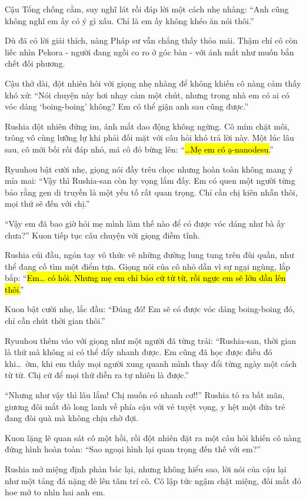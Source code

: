 \documentclass[../main.tex]{subfiles}
\begin{document}
Cậu Tổng chống cằm, suy nghĩ lát rồi đáp lời một cách nhẹ nhàng: ``Anh cũng không nghĩ em ấy có ý gì xấu. Chỉ là em ấy không khéo ăn nói thôi.''

Dù đã có lời giải thích, nàng Pháp sư vẫn chẳng thấy thỏa mái. Thậm chí cô còn liếc nhìn Pekora - người đang ngồi co ro ở góc bàn - với ánh mắt như muốn bắn chết đối phương.

Cậu thở dài, đột nhiên hỏi với giọng nhẹ nhàng để không khiến cô nàng cảm thấy khó xử: ``Nói chuyện này hơi nhạy cảm một chút, nhưng trong nhà em có ai có vóc dáng `boing-boing' không? Em có thể giận anh sau cũng được.''

Rushia đột nhiên đứng im, ánh mắt dao động không ngừng. Cô mím chặt môi, trông vô cùng lưỡng lự khi phải đối mặt với câu hỏi khó trả lời này. Một lúc lâu sau, cô mới bối rối đáp nhỏ, má cô đỏ bừng lên: ``\hl{\dots Mẹ em có ạ-nanodesu.}''

Ryuuhou bật cười nhẹ, giọng nói đầy trêu chọc nhưng hoàn toàn không mang ý mỉa mai: ``Vậy thì Rushia-san còn hy vọng lắm đấy. Em có quen một người từng bảo rằng gen di truyền là một yếu tố rất quan trọng. Chỉ cần chị kiên nhẫn thôi, mọi thứ sẽ đến với chị.''

``Vậy em đã bao giờ hỏi mẹ mình làm thế nào để có được vóc dáng như bà ấy chưa?'' Kuon tiếp tục câu chuyện với giọng điềm tĩnh.

Rushia cúi đầu, ngón tay vô thức vẽ những đường lung tung trên đùi quần, như thể đang cố tìm một điểm tựa. Giọng nói của cô nhỏ dần vì sự ngại ngùng, lắp bắp: ``\hl{Em\dots{} có hỏi. Nhưng mẹ em chỉ bảo cứ từ từ, rồi ngực em sẽ lớn dần lên thôi.}''

Kuon bật cười nhẹ, lắc đầu: ``Đúng đó! Em sẽ có được vóc dáng boing-boing đó, chỉ cần chút thời gian thôi.''

Ryuuhou thêm vào với giọng như một người đã từng trải: ``Rushia-san, thời gian là thứ mà không ai có thể đẩy nhanh được. Em cũng đã học được điều đó khi\dots\ ờm, khi em thấy mọi người xung quanh mình thay đổi từng ngày một cách từ từ. Chị cứ để mọi thứ diễn ra tự nhiên là được.''

``Nhưng như vậy thì lâu lắm! Chị muốn có nhanh cơ!!'' Rushia tỏ ra bất mãn, giương đôi mắt đỏ long lanh về phía cậu với vẻ tuyệt vọng, y hệt một đứa trẻ đang đòi quà mà không chịu chờ đợi.

Kuon lặng lẽ quan sát cô một hồi, rồi đột nhiên đặt ra một câu hỏi khiến cô nàng đứng hình hoàn toàn: ``Sao ngoại hình lại quan trọng đến thế với em?''

Rushia mở miệng định phản bác lại, nhưng không hiểu sao, lời nói của cậu lại như một tảng đá nặng đè lên tâm trí cô. Cô lập tức ngậm chặt miệng, đôi mắt đỏ hoe mở to nhìn hai anh em.
\end{document}
